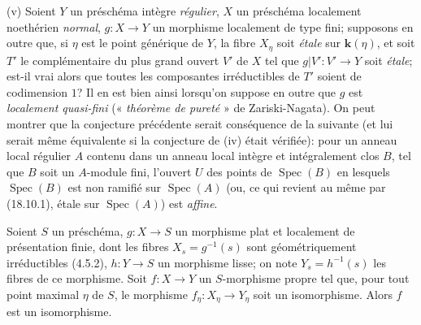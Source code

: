 \begin{remarks}[21.12.14]
(v) Soient $Y$ un préschéma intègre \emph{régulier}, $X$ un préschéma localement
noethérien \emph{normal}, $g:X\to Y$ un morphisme localement de type fini; supposons
en outre que, si $\eta$ est le point générique de $Y$, la fibre $X_\eta$ soit \emph{étale}
sur $\boldsymbol{k}(\eta)$, et soit $T'$ le complémentaire du plus grand ouvert $V'$ de $X$ tel que
$g|V':V'\to Y$ soit \emph{étale}; est-il vrai alors que toutes les composantes irréductibles de
$T'$ soient de codimension $1$? Il en est bien ainsi lorsqu'on suppose en outre que $g$
est \emph{localement quasi-fini} (« \emph{théorème de pureté} » de Zariski-Nagata). On peut
montrer que la conjecture précédente serait conséquence de la suivante (et lui serait
même équivalente si la conjecture de (iv) était vérifiée): pour un anneau local régulier
$A$ contenu dans un anneau local intègre et intégralement clos $B$, tel que $B$ soit un
$A$-module fini, l'ouvert $U$ des points de $\operatorname{Spec}(B)$ en lesquels
$\operatorname{Spec}(B)$ est non ramifié sur $\operatorname{Spec}(A)$ (ou, ce qui
revient au même par (18.10.1), étale sur $\operatorname{Spec}(A)$) est \emph{affine}.
\end{remarks}

\begin{proposition}[21.12.15]
\label{IV.21.12.15}
Soient $S$ un préschéma, $g:X\to S$ un morphisme plat et localement de présentation
finie, dont les fibres $X_s=g^{-1}(s)$ sont géométriquement irréductibles \textup{(4.5.2)},
$h:Y\to S$ un morphisme lisse; on note $Y_s=h^{-1}(s)$ les fibres de ce morphisme.
Soit $f:X\to Y$ un $S$-morphisme propre tel que, pour tout point maximal $\eta$ de
$S$, le morphisme $f_\eta:X_\eta\to Y_\eta$ soit un isomorphisme. Alors $f$ est un
isomorphisme.
\end{proposition}

